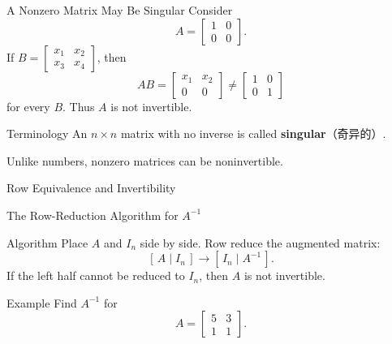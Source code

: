 \begin{frame}{A Nonzero Matrix May Be Singular}
Consider
\[
A=\begin{bmatrix}1&0\\0&0\end{bmatrix}.
\]
If $B=\begin{bmatrix}x_1&x_2\\x_3&x_4\end{bmatrix}$, then
\[
AB=\begin{bmatrix}x_1&x_2\\0&0\end{bmatrix}
\ne
\begin{bmatrix}1&0\\0&1\end{bmatrix}
\]
for every $B$. Thus $A$ is not invertible.
\begin{block}{Terminology}
An $n\times n$ matrix with no inverse is called \textbf{singular}（奇异的）.
\end{block}
Unlike numbers, nonzero matrices can be noninvertible.
\end{frame}

\begin{frame}{Row Equivalence and Invertibility}
\medskip

\end{frame}

\begin{frame}{The Row-Reduction Algorithm for $A^{-1}$}
\begin{block}{Algorithm}
Place $A$ and $I_n$ side by side. Row reduce the augmented matrix:
\[
[\,A\mid I_n\,]\longrightarrow[\,I_n\mid A^{-1}\,].
\]
If the left half cannot be reduced to $I_n$, then $A$ is not invertible.
\end{block}
\medskip
\begin{exampleblock}{Example}
Find $A^{-1}$ for
\[
A=\begin{bmatrix}5&3\\1&1\end{bmatrix}.
\]
\end{exampleblock}
\end{frame}


